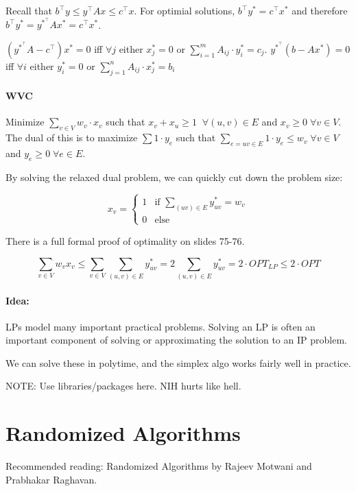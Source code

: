 \documentclass[a4paper]{article}
\begin{document}
Recall that $b^\intercal y \le y^\intercal Ax \le c^\intercal x$.
For optimial solutions, $b^\intercal y^*=c^\intercal x^*$ and therefore $b^\intercal y^* = y^{*^\intercal} Ax^* = c^\intercal x^*$.

$(y^{*^\intercal}A - c^\intercal)x^* = 0$ iff $\forall j$ either $x_j^*=0$ or $\sum_{i=1}^m A_{ij} \cdot y^*_i = c_j$.
$y^{*^\intercal}(b-Ax^*)=0$ iff $\forall i$ either $y^*_i=0$ or $\sum_{j=1}^n A_{ij} \cdot x^*_j = b_i$

\paragraph{WVC}
Minimize $\sum_{v\in V} w_v \cdot x_v$ such that $x_v+x_u \ge 1 \;\; \forall (u,v) \in E$ and $x_v \ge 0 \; \forall v \in V$.
The dual of this is to maximize $\sum 1 \cdot y_e$ such that $\sum_{e=uv \in E} 1\cdot y_e \le w_v \; \forall v \in V$ and $y_e \ge 0 \; \forall e \in E$.

By solving the relaxed dual problem, we can quickly cut down the problem size:

\[x_v = \begin{cases}
1 & \text{if }\sum_{(uv) \in E} y^*_{uv}=w_v \\
0 & \text{else}
\end{cases}\]

There is a full formal proof of optimality on slides 75-76.

\[\sum_{v\in V}w_vx_v \le \sum_{v \in V} \sum_{(u,v) \in E} y^*_{uv}=2 \sum_{(u,v) \in E} y^*_{uv} = 2 \cdot OPT_{LP} \le 2 \cdot OPT\]

\paragraph{Idea:}
LPs model many important practical problems. Solving an LP is often an important component of solving or approximating the solution to an IP problem.

We can solve these in polytime, and the simplex algo works fairly well in practice.

NOTE: Use libraries/packages here. NIH hurts like hell.

\section{Randomized Algorithms}

Recommended reading: Randomized Algorithms by Rajeev Motwani and Prabhakar Raghavan.
\end{document}
